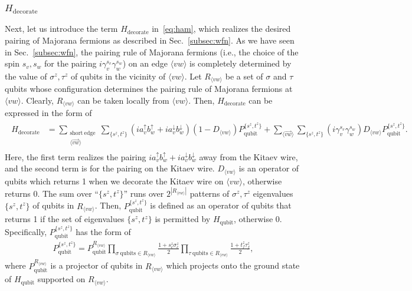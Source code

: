 \documentclass[12pt]{article}
\numberwithin{equation}{section}
\newcommand{\comment}[1]{\textcolor{red}{[#1]}}
\begin{document}
\subsubsection{$H_{\mathrm{decorate}}$}

Next, let us introduce the term $H_{\mathrm{decorate}}$ in~\eqref{eq:ham}, which realizes the desired pairing of Majorana fermions as described in Sec.~\ref{subsec:wfn}.
As we have seen in Sec.~\ref{subsec:wfn}, the pairing rule of Majorana fermions (i.e., the choice of the spin $s_v, s_w$ for the pairing $i\gamma_v^{s_v}\gamma_{w}^{s_w}$) on an edge $\langle vw\rangle$ is completely determined by the value of $\sigma^z, \tau^z$ of qubits in the vicinity of $\langle vw\rangle$. 
Let $R_{\langle vw\rangle}$ be a set of $\sigma$ and $\tau$ qubits whose configuration determines the pairing rule of Majorana fermions at $\langle vw\rangle$.
Clearly,  $R_{\langle vw\rangle}$ can be taken locally from $\langle vw\rangle$.
Then, $H_{\mathrm{decorate}}$ can be expressed in the form of
\begin{align}
\begin{split}
    H_{\mathrm{decorate}} &=\sum_{\substack{\mathrm{short\ edge}\\ \langle\overrightarrow{vw}\rangle}}\sum_{\{s^z, t^z\}} (ia_v^{\uparrow}b_{w}^{\uparrow}+ia_v^{\downarrow}b_{w}^{\downarrow})(1-D_{\langle vw\rangle})P_{\mathrm{qubit}}^{\{s^z,t^z\}}+\sum_{\langle \overrightarrow{vw}\rangle} \sum_{\{s^z, t^z\}} (i\gamma_v^{s_v}\gamma_{w}^{s_w})D_{\langle vw\rangle}P_{\mathrm{qubit}}^{\{s^z,t^z\}}.
    \end{split}
    \label{eq:hdeco}
\end{align}
Here, the first term realizes the pairing $ia_v^{\uparrow}b_{w}^{\uparrow}+ia_v^{\downarrow}b_{w}^{\downarrow}$ away from the Kitaev wire, and the second term is for the pairing on the Kitaev wire.
$D_{\langle vw\rangle}$ is an operator of qubits which returns 1 when we decorate the Kitaev wire on $\langle vw\rangle$, otherwise returns 0. 
The sum over ``$\{s^z, t^z\}$'' runs over $2^{|R_{\langle vw\rangle}|}$ patterns of $\sigma^z, \tau^z$ eigenvalues $\{s^z,t^z\}$ of qubits in $R_{\langle vw\rangle}$. Then, $P_{\mathrm{qubit}}^{\{s^z,t^z\}}$ is defined as an operator of qubits that returns 1 if the set of eigenvalues $\{s^z, t^z\}$ is permitted by $H_{\mathrm{qubit}}$, otherwise 0. Specifically, $P_{\mathrm{qubit}}^{\{s^z,t^z\}}$ has the form of
\begin{align}
    P_{\mathrm{qubit}}^{\{s^z,t^z\}}=P_{\mathrm{qubit}}^{R_{\langle vw\rangle}}\prod_{\sigma\  \mathrm{qubits}\in  R_{\langle vw\rangle} }\frac{1+s^z_c\sigma^z_c}{2}\prod_{\tau\ \mathrm{qubits} \in R_{\langle vw\rangle}}\frac{1+ t^z_f\tau^z_f}{2},
\end{align}
where $P_{\mathrm{qubit}}^{R_{\langle vw\rangle}}$ is a projector of qubits in $R_{\langle vw\rangle}$ which projects onto the ground state of $H_{\mathrm{qubit}}$ supported on $R_{\langle vw\rangle}$.
\end{document}

